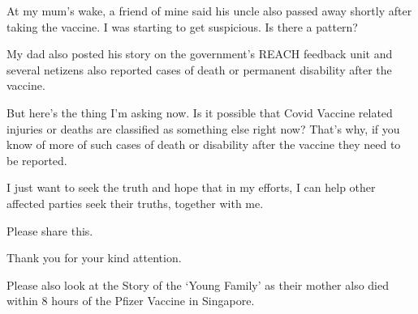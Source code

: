 At my mum’s wake, a friend of mine said his uncle also passed away shortly after
taking the vaccine. I was starting to get suspicious. Is there a pattern?

My dad also posted his story on the government’s REACH feedback unit and several
netizens also reported cases of death or permanent disability after the vaccine.

But here’s the thing I’m asking now. Is it possible that Covid Vaccine related
injuries or deaths are classified as something else right now? That’s why, if
you know of more of such cases of death or disability after the vaccine they
need to be reported.

I just want to seek the truth and hope that in my efforts, I can help other
affected parties seek their truths, together with me.

Please share this.

Thank you for your kind attention.

Please also look at the Story of the ‘Young Family’ as their mother also died
within 8 hours of the Pfizer Vaccine in Singapore.

